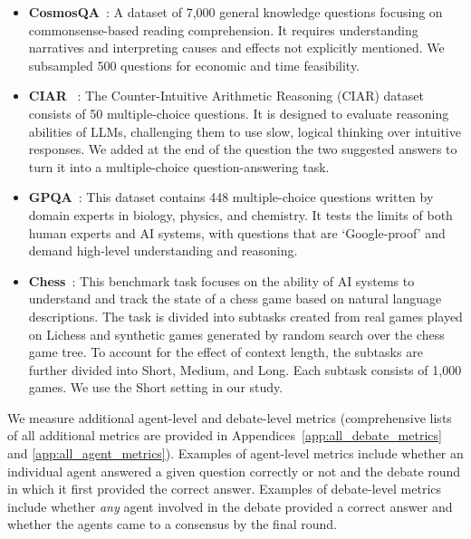 \documentclass{article}  %
\begin{document}
\begin{itemize}
\item \textbf{CosmosQA}~\citep{2019CosmosQA}: A dataset of 7,000 general knowledge questions focusing on commonsense-based reading comprehension. It requires understanding narratives and interpreting causes and effects not explicitly mentioned. We subsampled 500 questions for economic and time feasibility.
\item \textbf{CIAR} ~\citep{liang2023encouraging}: The Counter-Intuitive Arithmetic Reasoning (CIAR) dataset consists of 50 multiple-choice questions. It is designed to evaluate reasoning abilities of LLMs, challenging them to use slow, logical thinking over intuitive responses. We added at the end of the question the two suggested answers to turn it into a multiple-choice question-answering task. 
\item \textbf{GPQA}~\citep{rein2023gpqa}: This dataset contains 448 multiple-choice questions written by domain experts in biology, physics, and chemistry. It tests the limits of both human experts and AI systems, with questions that are `Google-proof' and demand high-level understanding and reasoning.
\item \textbf{Chess}~\citep{chessstatetracking}: This benchmark task focuses on the ability of AI systems to understand and track the state of a chess game based on natural language descriptions. The task is divided into subtasks created from real games played on Lichess and synthetic games generated by random search over the chess game tree. To account for the effect of context length, the subtasks are further divided into Short, Medium, and Long. Each subtask consists of 1,000 games. We use the Short setting in our study.
\end{itemize}


We measure additional agent-level and debate-level metrics (comprehensive lists of all additional metrics are provided in Appendices~\ref{app:all_debate_metrics} and \ref{app:all_agent_metrics}). 
Examples of agent-level metrics include whether an individual agent answered a given question correctly or not and the debate round in which it first provided the correct answer.  
Examples of debate-level metrics include whether \textit{any} agent involved in the debate provided a correct answer and 
whether the agents came to a consensus by the final round.
\end{document}
